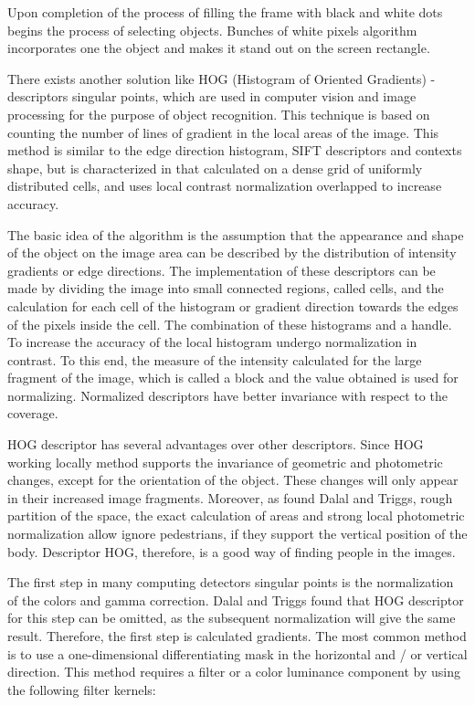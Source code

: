 Upon completion of the process of filling the frame with black and white dots begins the process of selecting objects. Bunches of white pixels algorithm incorporates one the object and makes it stand out on the screen rectangle. 

There exists another solution like HOG (Histogram of Oriented Gradients) - descriptors singular points, which are used in computer vision and image processing for the purpose of object recognition. This technique is based on counting the number of lines of gradient in the local areas of the image. This method is similar to the edge direction histogram, SIFT descriptors and contexts shape, but is characterized in that calculated on a dense grid of uniformly distributed cells, and uses local contrast normalization overlapped to increase accuracy.

The basic idea of the algorithm is the assumption that the appearance and shape of the object on the image area can be described by the distribution of intensity gradients or edge directions. The implementation of these descriptors can be made by dividing the image into small connected regions, called cells, and the calculation for each cell of the histogram or gradient direction towards the edges of the pixels inside the cell. The combination of these histograms and a handle. To increase the accuracy of the local histogram undergo normalization in contrast. To this end, the measure of the intensity calculated for the large fragment of the image, which is called a block and the value obtained is used for normalizing. Normalized descriptors have better invariance with respect to the coverage.

HOG descriptor has several advantages over other descriptors. Since HOG working locally method supports the invariance of geometric and photometric changes, except for the orientation of the object. These changes will only appear in their increased image fragments. Moreover, as found Dalal and Triggs, rough partition of the space, the exact calculation of areas and strong local photometric normalization allow ignore pedestrians, if they support the vertical position of the body. Descriptor HOG, therefore, is a good way of finding people in the images.

The first step in many computing detectors singular points is the normalization of the colors and gamma correction. Dalal and Triggs found that HOG descriptor for this step can be omitted, as the subsequent normalization will give the same result. Therefore, the first step is calculated gradients. The most common method is to use a one-dimensional differentiating mask in the horizontal and / or vertical direction. This method requires a filter or a color luminance component by using the following filter kernels:

